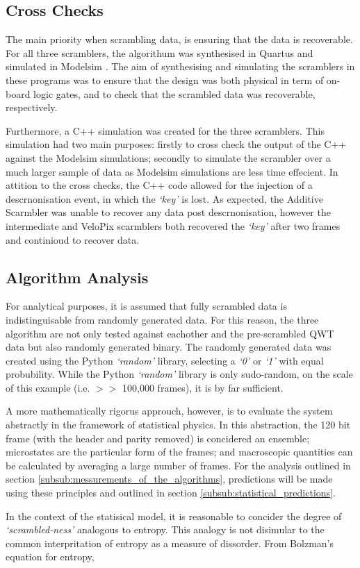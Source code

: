 	\subsection{Cross Checks} %
	\label{sub:cross_checks}
		The main priority when scrambling data, is ensuring that the data is recoverable.
		For all three scramblers, the algorithum was synthesised in Quartus \cite{ref:quartus} and simulated in Modelsim \cite{ref:modelsim}.
		The aim of synthesising and simulating the scramblers in these programs was to ensure that the design was both physical in term of on-board logic gates, and to check that the scrambled data was recoverable, respectively.
		\par
		Furthermore, a C++ simulation was created for the three scramblers.
		This simulation had two main purposes:
		firstly to cross check the output of the C++ against the Modelsim simulations;
		secondly to simulate the scrambler over a much larger sample of data as Modelsim simulations are less time effecient.
		In attition to the cross checks, the C++ code allowed for the injection of a descrnonisation event, in which the \textit{`key'} is lost.
		As expected, the Additive Scarmbler was unable to recover any data post descrnonisation, however the intermediate and VeloPix scarmblers both recovered the \textit{`key'} after two frames and continioud to recover data.


	\subsection{Algorithm Analysis}
	\label{sub:algorithm_analysis}

		For analytical purposes, it is assumed that fully scrambled data is indistinguisable from randomly generated data. 
		For this reason, the three algorithm are not only tested against eachother and the pre-scrambled QWT data but also randomly generated binary.
		The randomly generated data was created using the Python \textit{`random'} library, selecting a \textit{`0'} or \textit{`1'} with equal probubility.
		While the Python \textit{`random'} library is only sudo-random, on the scale of this example (i.e. $>>$ 100,000 frames), it is by far sufficient.
		\par
		A more mathematically rigorus approuch, however, is to evaluate the system abstractly in the framework of statistical physics.
		In this abstraction, the 120 bit frame (with the header and parity removed)  is concidered an ensemble; 
		microstates are the particular form of the frames;
		and macroscopic quantities can be calculated by averaging a large number of frames.
		For the analysis outlined in section \ref{subsub:messurements_of_the_algorithms}, predictions will be made using these principles and outlined in section \ref{subsub:statistical_predictions}.
		\par
		In the context of the statisical model, it is reasonable to concider the degree of \textit{`scrambled-ness'} analogous to entropy.	This analogy is not disimular to the common interpritation of entropy as a measure of dissorder. From Bolzman's equation for entropy,

